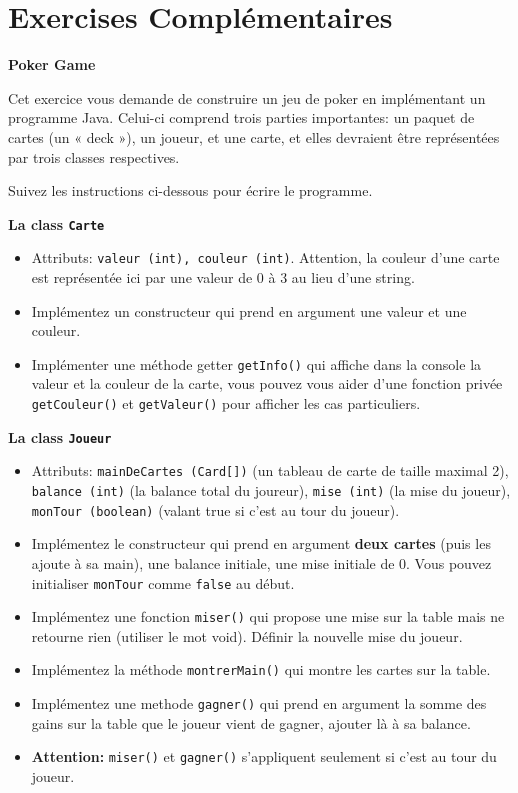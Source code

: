 \section{Exercises Complémentaires}
\begin{Exercice}[15 minutes]\textbf{Poker Game}

Cet exercice vous demande de construire un jeu de poker en implémentant un programme Java. Celui-ci comprend trois parties importantes: un paquet de cartes (un « deck »), un joueur, et une carte, et elles devraient être représentées par trois classes respectives.

Suivez les instructions ci-dessous pour écrire le programme.

\textbf{La class \lstinline{Carte}}
\begin{itemize}
    \item Attributs: \lstinline{valeur (int), couleur (int)}. Attention, la couleur d'une carte est représentée ici par une valeur de 0 à 3 au lieu d'une string.
    \item Implémentez un constructeur qui prend en argument une valeur et une couleur.
    \item Implémenter une méthode getter \lstinline{getInfo()} qui affiche dans la console la valeur et la couleur de la carte, vous pouvez vous aider d'une fonction privée \lstinline{getCouleur()} et \lstinline{getValeur()} pour afficher les cas particuliers.
\end{itemize}




\textbf{La class \lstinline{Joueur}}
\begin{itemize}
    \item Attributs: \lstinline{mainDeCartes (Card[])} (un tableau de carte de taille maximal 2), \lstinline{balance (int)} (la balance total du joureur), \lstinline{mise (int)} (la mise du joueur), \lstinline{monTour (boolean)} (valant true si c’est au tour du joueur).
    \item Implémentez le constructeur qui prend en argument \textbf{deux cartes} (puis les ajoute à sa main), une balance initiale, une mise initiale de 0. Vous pouvez initialiser \lstinline{monTour} comme \lstinline{false} au début.
    \item Implémentez une fonction \lstinline{miser()} qui propose une mise sur la table mais ne retourne rien (utiliser le mot void). Définir la nouvelle mise du joueur.
    \item Implémentez la méthode \lstinline{montrerMain()} qui montre les cartes sur la table.
    \item Implémentez une methode \lstinline{gagner()} qui prend en argument la somme des gains sur la table que le joueur vient de gagner, ajouter là à sa balance.
    \item \textbf{Attention:} \lstinline{miser()} et \lstinline{gagner()} s'appliquent seulement si c’est au tour du joueur.
\end{itemize}



\end{Exercice}
